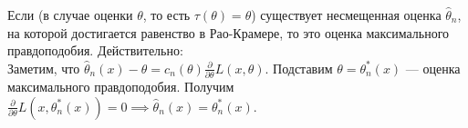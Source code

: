 Если (в случае оценки $\theta$, то есть $\tau(\theta) = \theta$) существует несмещенная оценка $\hat{\theta}_n$,
на которой достигается равенство в Рао-Крамере, то это оценка максимального правдоподобия. Действительно: \\
Заметим, что $\hat{\theta}_n(x) - \theta = c_n(\theta) \frac{\partial }{\partial \theta} L(x, \theta)$. Подставим $\theta = \theta_n^*(x)$ --- оценка максимального правдоподобия. Получим $\frac{\partial }{\partial \theta} L(x, \theta_n^*(x)) = 0 \implies \hat{\theta}_n(x) = \theta_n^*(x)$.
